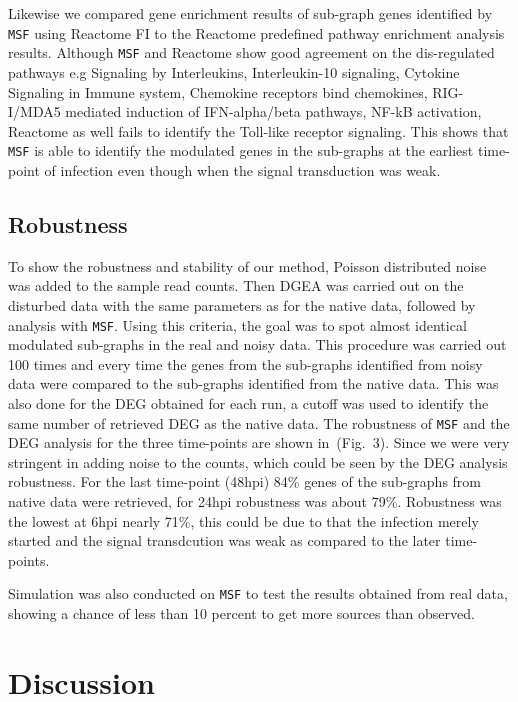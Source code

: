 \documentclass[twocolumn]{article}
\begin{document}
Likewise we compared gene enrichment results of sub-graph genes identified by \texttt{MSF} using Reactome FI to the Reactome predefined pathway enrichment analysis results. Although \texttt{MSF} and Reactome show good agreement on the dis-regulated pathways e.g Signaling by Interleukins, Interleukin-10 signaling, Cytokine Signaling in Immune system, Chemokine receptors bind chemokines, RIG-I/MDA5 mediated induction of IFN-alpha/beta pathways, NF-kB activation, Reactome as well fails to identify the Toll-like receptor signaling. This shows that \texttt{MSF} is able to identify the modulated genes in the sub-graphs at the earliest time-point of infection even though when the signal transduction was weak.

\subsection*{Robustness}

To show the robustness and stability of our method, Poisson distributed noise was added to the sample read counts. Then DGEA was carried out on the disturbed data with the same parameters as for the native data, followed by analysis with \texttt{MSF}. Using this criteria, the goal was to spot almost
identical modulated sub-graphs in the real and noisy data. This procedure was carried out 100 times and every time the genes from the sub-graphs identified from noisy data were compared to the sub-graphs identified from the native data. This was also done for the DEG obtained for each run, a cutoff was used to identify the same number of retrieved DEG as the native data.  The robustness of \texttt{MSF} and the DEG analysis for the three time-points are shown in~(Fig.~3). Since we were very stringent in adding noise to the counts, which could be seen by the DEG analysis robustness.
For the last time-point (48hpi) 84\% genes of the sub-graphs from native data were retrieved, for 24hpi robustness was about 79\%. Robustness was the lowest at 6hpi nearly 71\%, this could be due to that the infection merely started and the signal transdcution was weak as compared to the later time-points.

Simulation was also conducted on \texttt{MSF} to test the results
obtained from real data, showing a chance of less than 10 percent to
get more sources than observed.


\section*{Discussion}
\end{document}
